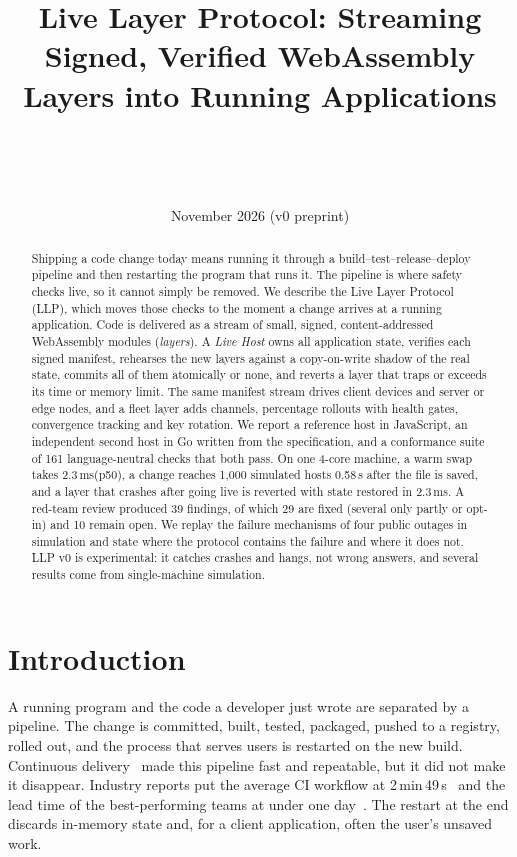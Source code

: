 \documentclass[10pt,twocolumn]{article}
\title{\textbf{Live Layer Protocol: Streaming Signed, Verified WebAssembly Layers into Running Applications}}
\author{\paperauthor\\{\small \paperaffil}\\{\small\paperemail \quad \paperorcid}\\{\small\repo}}
\date{November 2026 \quad (v0 preprint)}
\newcommand{\ms}{\,ms\xspace}
\newcommand{\s}{\,s\xspace}
\begin{document}
\maketitle

\begin{abstract}
Shipping a code change today means running it through a build--test--release--deploy pipeline and
then restarting the program that runs it. The pipeline is where safety checks live, so it cannot
simply be removed. We describe the Live Layer Protocol (LLP), which moves those checks to the moment
a change arrives at a running application. Code is delivered as a stream of small, signed,
content-addressed WebAssembly modules (\emph{layers}). A \emph{Live Host} owns all application
state, verifies each signed manifest, rehearses the new layers against a copy-on-write shadow of
the real state, commits all of them atomically or none, and reverts a layer that traps or exceeds
its time or memory limit. The same manifest stream drives client devices and server or edge nodes,
and a fleet layer adds channels, percentage rollouts with health gates, convergence tracking and
key rotation. We report a reference host in JavaScript, an independent second host in Go written
from the specification, and a conformance suite of 161 language-neutral checks that both pass.
On one 4-core machine, a warm swap takes 2.3\ms (p50), a change reaches 1{,}000 simulated hosts
0.58\s after the file is saved, and a layer that crashes after going live is reverted with state
restored in 2.3\ms. A red-team review produced 39 findings, of which 29 are fixed (several only
partly or opt-in) and 10 remain open. We replay the failure mechanisms of four public outages in
simulation and state where the protocol contains the failure and where it does not. LLP v0 is
experimental: it catches crashes and hangs, not wrong answers, and several results come from
single-machine simulation.
\end{abstract}

\section{Introduction}

A running program and the code a developer just wrote are separated by a pipeline. The change is
committed, built, tested, packaged, pushed to a registry, rolled out, and the process that serves
users is restarted on the new build. Continuous delivery~\cite{humble2010cd} made this pipeline
fast and repeatable, but it did not make it disappear. Industry reports put the average CI workflow
at 2\,min\,49\s~\cite{circleci2024} and the lead time of the best-performing teams at under one
day~\cite{dora2024}. The restart at the end discards in-memory state and, for a client application,
often the user's unsaved work.
\end{document}
